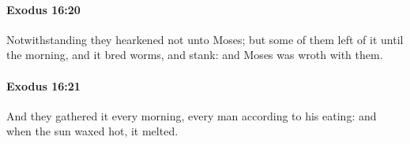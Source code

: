 		\paragraph{Exodus 16:20} %
			\label{EXODUS-16-20}

			Notwithstanding they hearkened not unto Moses; but some of them left of it until the morning, and it bred worms, and stank: and Moses was wroth with them.


		\paragraph{Exodus 16:21} %
			\label{EXODUS-16-21}

			And they gathered it every morning, every man according to his eating: and when the sun waxed hot, it melted.



